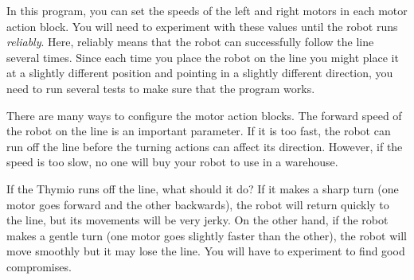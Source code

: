 In this program, you can set the speeds of the
left and right motors in each motor action block. You will need to
experiment with these values until the robot runs \emph{reliably}. Here,
reliably means that the robot can successfully follow the line several times.
Since each time you place the robot on
the line you might place it at a slightly different position and
pointing in a slightly different direction, you need to run
several tests to make sure that the program works.

There are many ways to configure the motor action blocks.
The forward speed of the robot on the line is an important parameter.
If it is too fast, the robot can run off the line before the turning actions can affect its direction. However, if the speed is too slow, no one will buy your robot to use in a warehouse.

If the Thymio runs off the line, what should it do?
If it makes a sharp turn (one motor goes forward and the other backwards),
the robot will return quickly to the line, but its movements will be very jerky.
On the other hand, if the robot makes a gentle turn (one motor goes slightly faster than the other), the robot will move smoothly but it may lose the line.
You will have to experiment to find good compromises.

\newpage


\vfill


\vfill


